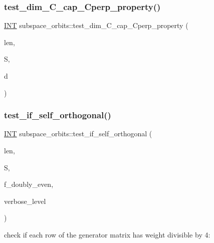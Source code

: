 \subsubsection{\texorpdfstring{test\+\_\+dim\+\_\+\+C\+\_\+cap\+\_\+\+Cperp\+\_\+property()}{test\_dim\_C\_cap\_Cperp\_property()}}
{\footnotesize\ttfamily \mbox{\hyperlink{galois_8h_a09fddde158a3a20bd2dcadb609de11dc}{I\+NT}} subspace\+\_\+orbits\+::test\+\_\+dim\+\_\+\+C\+\_\+cap\+\_\+\+Cperp\+\_\+property (\begin{DoxyParamCaption}\item[{\mbox{\hyperlink{galois_8h_a09fddde158a3a20bd2dcadb609de11dc}{I\+NT}}}]{len,  }\item[{\mbox{\hyperlink{galois_8h_a09fddde158a3a20bd2dcadb609de11dc}{I\+NT}} $\ast$}]{S,  }\item[{\mbox{\hyperlink{galois_8h_a09fddde158a3a20bd2dcadb609de11dc}{I\+NT}}}]{d }\end{DoxyParamCaption})}

\mbox{\label{classsubspace__orbits_a865c2e94829c9c3b90a4edb9aabefc26}} 
\subsubsection{\texorpdfstring{test\+\_\+if\+\_\+self\+\_\+orthogonal()}{test\_if\_self\_orthogonal()}}
{\footnotesize\ttfamily \mbox{\hyperlink{galois_8h_a09fddde158a3a20bd2dcadb609de11dc}{I\+NT}} subspace\+\_\+orbits\+::test\+\_\+if\+\_\+self\+\_\+orthogonal (\begin{DoxyParamCaption}\item[{\mbox{\hyperlink{galois_8h_a09fddde158a3a20bd2dcadb609de11dc}{I\+NT}}}]{len,  }\item[{\mbox{\hyperlink{galois_8h_a09fddde158a3a20bd2dcadb609de11dc}{I\+NT}} $\ast$}]{S,  }\item[{\mbox{\hyperlink{galois_8h_a09fddde158a3a20bd2dcadb609de11dc}{I\+NT}}}]{f\+\_\+doubly\+\_\+even,  }\item[{\mbox{\hyperlink{galois_8h_a09fddde158a3a20bd2dcadb609de11dc}{I\+NT}}}]{verbose\+\_\+level }\end{DoxyParamCaption})}

check if each row of the generator matrix has weight divisible by 4\+: \mbox{\label{classsubspace__orbits_a1f2db8939222a53a430d7239d02bd07c}} 
